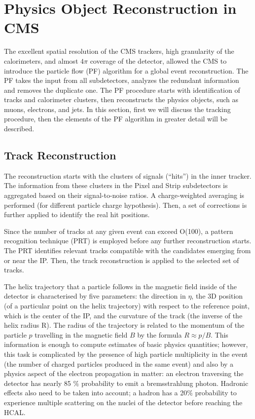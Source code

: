 
\chapter{Physics Object Reconstruction in CMS} \label{sec:cms_reco}

The excellent spatial resolution of the CMS trackers, high granularity of the calorimeters, and almost $4\pi$ coverage of the detector, allowed the CMS to introduce the particle flow (PF) algorithm \cite{Particle_flow} for a global event reconstruction. The PF takes the input from all subdetectors, analyzes the redundant information and removes the duplicate one. The PF procedure starts with identification of tracks and calorimeter clusters, then reconstructs the physics objects, such as muons, electrons, and jets. In this section, first we will discuss the tracking procedure, then the elements of the PF algorithm in greater detail will be described.
    
\section{Track Reconstruction}\label{sec:track_reconstruction}

The reconstruction starts with the clusters of signals (``hits'') in the inner tracker. The information from these clusters in the Pixel and Strip subdetectors is aggregated based on their signal-to-noise ratios. A charge-weighted averaging is performed (for different particle charge hypothesis). Then, a set of corrections is further applied to identify the real hit positions. 

Since the number of tracks at any given event can exceed O(100), a pattern recognition technique (PRT) is employed before any further reconstruction starts. The PRT identifies relevant tracks compatible with the candidates emerging from or near the IP. Then, the track reconstruction is applied to the selected set of tracks. 


The helix trajectory that a particle follows in the magnetic field inside of the detector is characterised by five parameters: the direction in $\eta$, the 3D position (of a particular point on the helix trajectory) with respect to the reference point, which is the center of the IP, and the curvature of the track (the inverse of the helix radius R). The radius of the trajectory is related to the momentum of the particle $p$ travelling in the magnetic field $B$ by the formula $R \approx p/B$. This information is enough to compute estimates of basic physics quantities; however, this task is complicated by the presence of high particle multiplicity in the event (the number of charged particles produced in the same event) and also by a physics aspect of the electron propagation in matter: an electron traversing the detector has nearly 85 $\%$ probability to emit a bremsstrahlung photon. Hadronic effects also need to be taken into account; a hadron has a 20$\%$ probability to experience multiple scattering on the nuclei of the detector before reaching the HCAL. 



